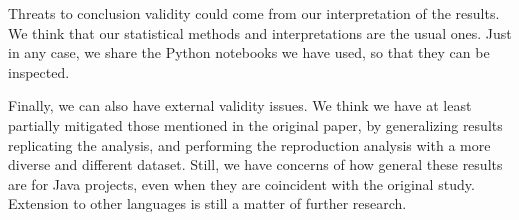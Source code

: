 Threats to conclusion validity could come from our interpretation of the results. We think that our statistical methods and interpretations are the usual ones. Just in any case, we share the Python notebooks we have used, so that they can be inspected.

Finally, we can also have external validity issues. We think we have at least partially mitigated those mentioned in the original paper, by generalizing results replicating the analysis, and performing the reproduction analysis with a more diverse and different dataset. Still, we have concerns of how general these results are for Java projects, even when they are coincident with the original study. Extension to other languages is still a matter of further research.
